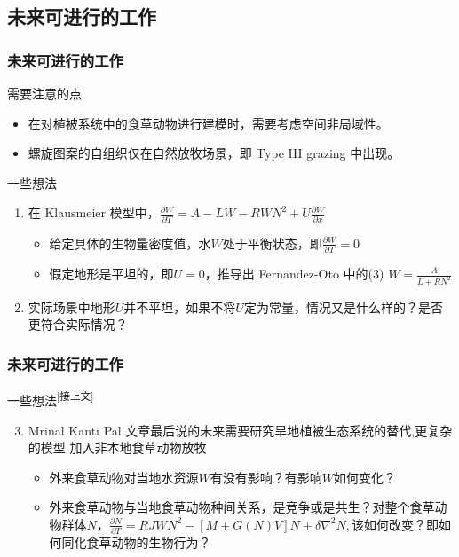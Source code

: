 \documentclass[aspectratio=169, 12pt, utf8, mathserif]{ctexbeamer} %
\begin{document}
\subsection{未来可进行的工作}
\begin{frame}
	\frametitle{未来可进行的工作}
	\begin{exampleblock}{需要注意的点}
		\begin{itemize}
			\item 在对植被系统中的食草动物进行建模时，需要考虑空间非局域性。
			\item 螺旋图案的自组织仅在自然放牧场景，即 Type III grazing 中出现。
		\end{itemize}
	\end{exampleblock}
	
	\begin{block}{一些想法}
		\begin{enumerate}
			\item 在 Klausmeier 模型中，\(\frac{\partial W}{\partial T}=A-LW-RWN^{2}+U\frac{\partial W}{\partial x}\)
			\begin{itemize}
				\item 给定具体的生物量密度值，水\(W\)处于平衡状态，即\(\frac{\partial W}{\partial T}=0\)
				\item 假定地形是平坦的，即\(U = 0\)，推导出 Fernandez-Oto 中的(3) \(W=\frac{A}{L+RN^{2}}\)
			\end{itemize}
			
			\item 实际场景中地形\(U\)并不平坦，如果不将\(U\)定为常量，情况又是什么样的？是否更符合实际情况？ 
		\end{enumerate}
	\end{block}
\end{frame}

\begin{frame}
	\frametitle{未来可进行的工作}
	\begin{block}{一些想法\textsuperscript{{\tiny [接上文]}}}
	\begin{enumerate}
		\setcounter{enumi}{2} %
		\item Mrinal Kanti Pal 文章最后说的未来需要研究旱地植被生态系统的替代\cite{[8]},\cite{[9]}更复杂的模型 \cite{[6]}\cite{[7]}\cite{[8]}\cite{[9]}加入非本地食草动物放牧
		\begin{itemize}
			\item 外来食草动物对当地水资源\(W\)有没有影响\cite{[7]}？有影响\(W\)如何变化？
			\item 外来食草动物与当地食草动物种间关系，是竞争或是共生？\cite{[9]}对整个食草动物群体\(N\)，\(\frac{\partial N}{\partial T}=RJWN^2-[M+G(N)V]N+\delta\nabla^2N,\)该如何改变？即如何同化食草动物的生物行为？
		\end{itemize}
	\end{enumerate}
	\end{block}
\end{frame}
\end{document}
